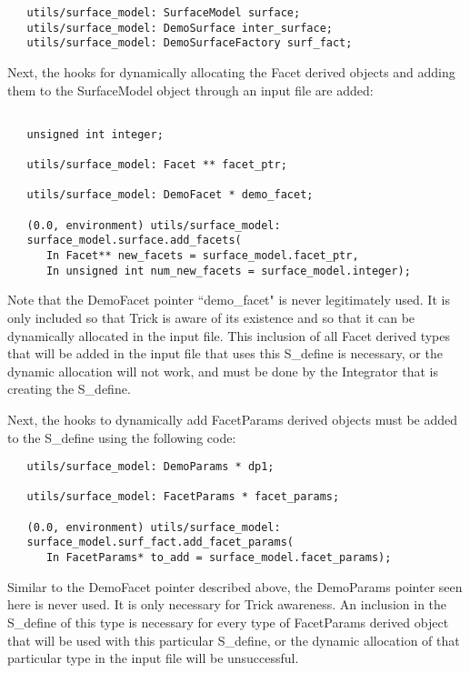 \begin{verbatim}
   utils/surface_model: SurfaceModel surface;
   utils/surface_model: DemoSurface inter_surface;
   utils/surface_model: DemoSurfaceFactory surf_fact;
\end{verbatim}

Next, the hooks for dynamically allocating the Facet derived objects
and adding them to the SurfaceModel object through an input file are
added:

\begin{verbatim}

   unsigned int integer;

   utils/surface_model: Facet ** facet_ptr;

   utils/surface_model: DemoFacet * demo_facet;

   (0.0, environment) utils/surface_model:
   surface_model.surface.add_facets(
      In Facet** new_facets = surface_model.facet_ptr,
      In unsigned int num_new_facets = surface_model.integer);

\end{verbatim}

Note that the DemoFacet pointer ``demo\_facet" is never legitimately
used. It is only included so that Trick is aware of its existence
and so that it can be dynamically allocated in the input file.
This inclusion of all Facet derived types that will be added
in the input file that uses this S\_define is necessary, or the
dynamic allocation will not work, and must be done by the Integrator
that is creating the S\_define.

Next, the hooks to dynamically add FacetParams derived objects
must be added to the S\_define using the following code:

\begin{verbatim}
   utils/surface_model: DemoParams * dp1;

   utils/surface_model: FacetParams * facet_params;

   (0.0, environment) utils/surface_model:
   surface_model.surf_fact.add_facet_params(
      In FacetParams* to_add = surface_model.facet_params);
\end{verbatim}

Similar to the DemoFacet pointer described above, the DemoParams
pointer seen here is never used. It is only necessary for Trick
awareness. An inclusion in the S\_define of this type is
necessary for every type of FacetParams derived object that will be
used with this particular S\_define, or the dynamic allocation of that
particular type in the input file will be unsuccessful.

